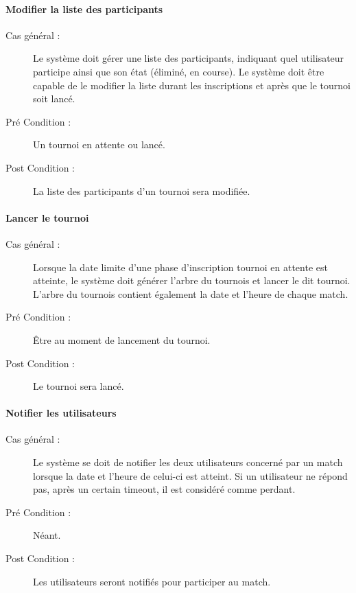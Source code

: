 \documentclass[a4paper]{article}
\begin{document}
\paragraph{Modifier la liste des \glspl{participant}}
\begin{description}
\item[Cas général :] Le système doit gérer une liste des \glspl{participant}, indiquant quel \gls{utilisateur} participe ainsi que son état (éliminé, en course). Le système doit être capable de le modifier la liste durant les inscriptions et après que le tournoi soit lancé.
\item[Pré Condition  :] Un tournoi en attente ou lancé.
\item[Post Condition :] La liste des \glspl{participant} d'un tournoi sera modifiée.
\end{description}

\paragraph{Lancer le tournoi}
\begin{description}
\item[Cas général :] Lorsque la date limite d'une phase d'inscription tournoi en attente est atteinte, le système doit générer l'arbre du tournois et lancer le dit tournoi. L'arbre du tournois contient également la date et l'heure de chaque match.
\item[Pré Condition  :] Être au moment de lancement du tournoi.
\item[Post Condition :] Le tournoi sera lancé.
\end{description}

\paragraph{Notifier les \glspl{utilisateur}}
\begin{description}
\item[Cas général :] Le système se doit de notifier les deux \glspl{utilisateur} concerné par un match lorsque la date et l'heure de celui-ci est atteint. Si un \gls{utilisateur} ne répond pas, après un certain timeout, il est considéré comme perdant.
\item[Pré Condition  :] Néant.
\item[Post Condition :] Les \glspl{utilisateur} seront notifiés pour participer au match.
\end{description}
\end{document}

